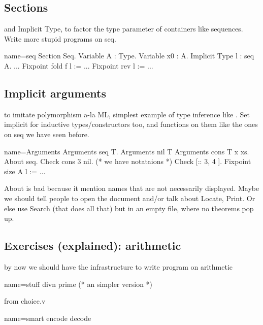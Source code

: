 \subsection{Sections}
and Implicit Type, to factor the type parameter of containers like
sequences.  Write more stupid programs on seq.

\begin{coq}{name=seq}{}
Section Seq.
Variable A : Type.
Variable x0 : A.
Implicit Type l : seq A.
...
Fixpoint fold f l := ...
Fixpoint rev l := ...
\end{coq}


\subsection{Implicit arguments}
to imitate polymorphism a-la ML, simplest example of type inference
like .  Set implicit for inductive types/constructors too,
and functions on them like the ones on seq we have seen before.

\begin{coq}{name=Arguments}{}
Arguments seq {T}.
Arguments nil {T}
Arguments cons {T} x xs.
About seq.
Check cons 3 nil.
(* we have notataions *)
Check [:: 3, 4 ].
Fixpoint size A l := ...
\end{coq}

About is bad because it mention names that are not necessarily displayed.
Maybe we should tell people to open the document and/or talk about Locate,
Print.  Or else use Search (that does all that) but in an empty
file, where no theorems pop up.

\subsection{Exercises (explained): arithmetic}
by now we should have the infrastructure to write program on arithmetic

\begin{coq}{name=stuff}{}
divn
prime  (* an simpler version *)
\end{coq}

from choice.v

\begin{coq}{name=smart}{}
encode
decode
\end{coq}


